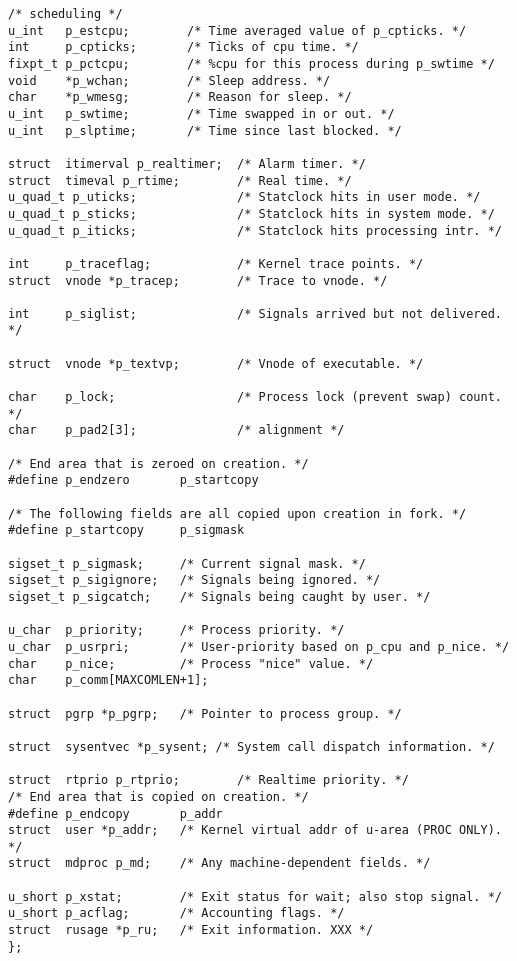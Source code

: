 \documentclass[10pt,letterpaper,onecolumn,draftclsnofoot]{IEEEtran}
\begin{document}
\begin{lstlisting}[caption=The FreeBSD proc structure is responsible for tracking the
state of processes.]
/* scheduling */
u_int   p_estcpu;        /* Time averaged value of p_cpticks. */
int     p_cpticks;       /* Ticks of cpu time. */
fixpt_t p_pctcpu;        /* %cpu for this process during p_swtime */
void    *p_wchan;        /* Sleep address. */
char    *p_wmesg;        /* Reason for sleep. */
u_int   p_swtime;        /* Time swapped in or out. */
u_int   p_slptime;       /* Time since last blocked. */

struct  itimerval p_realtimer;  /* Alarm timer. */
struct  timeval p_rtime;        /* Real time. */
u_quad_t p_uticks;              /* Statclock hits in user mode. */
u_quad_t p_sticks;              /* Statclock hits in system mode. */
u_quad_t p_iticks;              /* Statclock hits processing intr. */

int     p_traceflag;            /* Kernel trace points. */
struct  vnode *p_tracep;        /* Trace to vnode. */

int     p_siglist;              /* Signals arrived but not delivered. */

struct  vnode *p_textvp;        /* Vnode of executable. */

char    p_lock;                 /* Process lock (prevent swap) count. */
char    p_pad2[3];              /* alignment */

/* End area that is zeroed on creation. */
#define p_endzero       p_startcopy

/* The following fields are all copied upon creation in fork. */
#define p_startcopy     p_sigmask

sigset_t p_sigmask;     /* Current signal mask. */
sigset_t p_sigignore;   /* Signals being ignored. */
sigset_t p_sigcatch;    /* Signals being caught by user. */

u_char  p_priority;     /* Process priority. */
u_char  p_usrpri;       /* User-priority based on p_cpu and p_nice. */
char    p_nice;         /* Process "nice" value. */
char    p_comm[MAXCOMLEN+1];

struct  pgrp *p_pgrp;   /* Pointer to process group. */

struct  sysentvec *p_sysent; /* System call dispatch information. */

struct  rtprio p_rtprio;        /* Realtime priority. */
/* End area that is copied on creation. */
#define p_endcopy       p_addr
struct  user *p_addr;   /* Kernel virtual addr of u-area (PROC ONLY). */
struct  mdproc p_md;    /* Any machine-dependent fields. */

u_short p_xstat;        /* Exit status for wait; also stop signal. */
u_short p_acflag;       /* Accounting flags. */
struct  rusage *p_ru;   /* Exit information. XXX */
};
\end{lstlisting}
\end{document}
